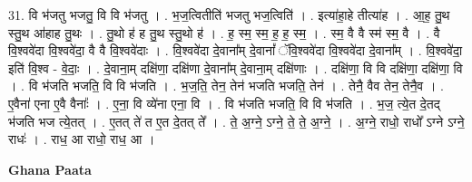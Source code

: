 \documentclass[17pt]{extarticle}
\begin{document}
31. वि भ॑जतु भजतु॒ वि वि भ॑जतु । . भ॒ज॒त्वितीति॑ भजतु भज॒त्विति॑ । . इत्या॑हा॒हे तीत्या॑ह । . आ॒ह॒ तु॒थ स्तु॒थ आ॑हाह तु॒थः । . तु॒थो ह॑ ह तु॒थ स्तु॒थो ह॑ । . ह॒ स्म॒ स्म॒ ह॒ ह॒ स्म॒ । . स्म॒ वै वै स्म॑ स्म॒ वै । . वै वि॒श्ववे॑दा वि॒श्ववे॑दा॒ वै वै वि॒श्ववे॑दाः । . वि॒श्ववे॑दा दे॒वाना᳚म् दे॒वानां᳚ ॅवि॒श्ववे॑दा वि॒श्ववे॑दा दे॒वाना᳚म् । . वि॒श्ववे॑दा॒ इति॑ वि॒श्व - वे॒दाः॒ । . दे॒वाना॒म् दक्षि॑णा॒ दक्षि॑णा दे॒वाना᳚म् दे॒वाना॒म् दक्षि॑णाः । . दक्षि॑णा॒ वि वि दक्षि॑णा॒ दक्षि॑णा॒ वि । . वि भ॑जति भजति॒ वि वि भ॑जति । . भ॒ज॒ति॒ तेन॒ तेन॑ भजति भजति॒ तेन॑ । . तेनै॒ वैव तेन॒ तेनै॒व । . ए॒वैना॑ एना ए॒वै वैनाः᳚ । . ए॒ना॒ वि व्ये॑ना एना॒ वि । . वि भ॑जति भजति॒ वि वि भ॑जति । . भ॒ज॒ त्ये॒त दे॒तद् भ॑जति भज त्ये॒तत् । . ए॒तत् ते॑ त ए॒त दे॒तत् ते᳚ । . ते॒ अ॒ग्ने॒ ऽग्ने॒ ते॒ ते॒ अ॒ग्ने॒ । . अ॒ग्ने॒ राधो॒ राधो᳚ ऽग्ने ऽग्ने॒ राधः॑ । . राध॒ आ राधो॒ राध॒ आ । \newline

\textbf{Ghana Paata } \newline
\end{document}
